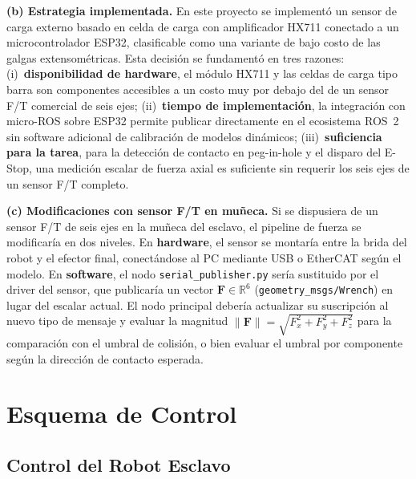 \documentclass[journal,10pt,twoside]{IEEEtran}
\begin{document}
\textbf{(b) Estrategia implementada.}
En este proyecto se implementó un sensor de carga externo basado en
celda de carga con amplificador HX711 conectado a un
microcontrolador ESP32, clasificable como una variante de bajo
costo de las galgas extensométricas. Esta decisión se fundamentó en
tres razones: (i)~\textbf{disponibilidad de hardware}, el módulo
HX711 y las celdas de carga tipo barra son componentes accesibles
a un costo muy por debajo del de un sensor F/T comercial de seis
ejes; (ii)~\textbf{tiempo de implementación}, la integración con
micro-ROS sobre ESP32 permite publicar directamente en el
ecosistema ROS~2 sin software adicional de calibración de modelos
dinámicos; (iii)~\textbf{suficiencia para la tarea}, para la
detección de contacto en peg-in-hole y el disparo del E-Stop,
una medición escalar de fuerza axial es suficiente sin requerir
los seis ejes de un sensor F/T completo.

\textbf{(c) Modificaciones con sensor F/T en muñeca.}
Si se dispusiera de un sensor F/T de seis ejes en la muñeca del
esclavo, el pipeline de fuerza se modificaría en dos niveles.
En \textbf{hardware}, el sensor se montaría entre la brida del
robot y el efector final, conectándose al PC mediante USB o
EtherCAT según el modelo. En \textbf{software}, el nodo
\texttt{serial\_publisher.py} sería sustituido por el driver
del sensor, que publicaría un vector
$\bm{F} \in \mathbb{R}^6$ (\texttt{geometry\_msgs/Wrench})
en lugar del escalar actual. El nodo principal debería actualizar
su suscripción al nuevo tipo de mensaje y evaluar la magnitud
$\|\bm{F}\| = \sqrt{F_x^2 + F_y^2 + F_z^2}$ para la comparación
con el umbral de colisión, o bien evaluar el umbral por
componente según la dirección de contacto esperada.

\section{Esquema de Control}
\label{sec:control}

\subsection{Control del Robot Esclavo}
\end{document}
